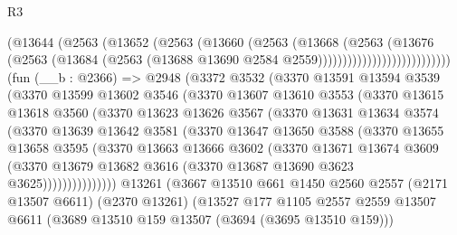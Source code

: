 \begin{lexlean}{R3}
\begin{coremodule}
                                (@13644
                                  (@2563
                                    (@13652
                                      (@2563
                                        (@13660
                                          (@2563
                                            (@13668
                                              (@2563
                                                (@13676
                                                  (@2563
                                                    (@13684
                                                      (@2563
                                                        (@13688
                                                          @13690
                                                          @2584
                                                          @2559)))))))))))))))))))))))))))
    (fun (__b : @2366) =>
    @2948
      (@3372
        @3532
        (@3370
          @13591
          @13594
          @3539
          (@3370
            @13599
            @13602
            @3546
            (@3370
              @13607
              @13610
              @3553
              (@3370
                @13615
                @13618
                @3560
                (@3370
                  @13623
                  @13626
                  @3567
                  (@3370
                    @13631
                    @13634
                    @3574
                    (@3370
                      @13639
                      @13642
                      @3581
                      (@3370
                        @13647
                        @13650
                        @3588
                        (@3370
                          @13655
                          @13658
                          @3595
                          (@3370
                            @13663
                            @13666
                            @3602
                            (@3370
                              @13671
                              @13674
                              @3609
                              (@3370
                                @13679
                                @13682
                                @3616
                                (@3370 @13687 @13690 @3623 @3625)))))))))))))))
    @13261
    (@3667
      @13510
      @661
      @1450
      @2560
      @2557
      (@2171 @13507 @6611)
      (@2370 @13261)
      (@13527
        @177
        @1105
        @2557
        @2559
        @13507
        @6611
        (@3689 @13510 @159 @13507 (@3694 (@3695 @13510 @159)))

\end{coremodule}
\end{lexlean}
